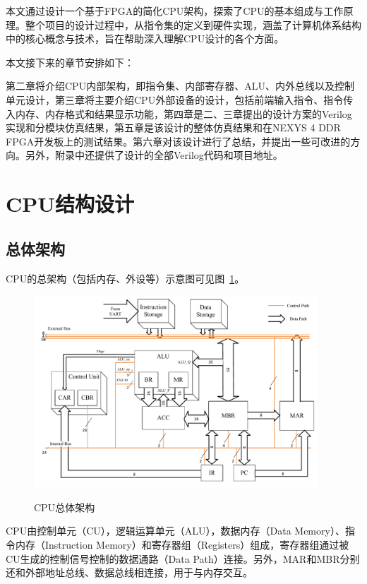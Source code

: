 \documentclass[lang=cn,a4paper,newtx]{elegantpaper}
\begin{document}
本文通过设计一个基于FPGA的简化CPU架构，探索了CPU的基本组成与工作原理。整个项目的设计过程中，从指令集的定义到硬件实现，涵盖了计算机体系结构中的核心概念与技术，旨在帮助深入理解CPU设计的各个方面。


本文接下来的章节安排如下：

第二章将介绍CPU内部架构，即指令集、内部寄存器、ALU、内外总线以及控制单元设计，第三章将主要介绍CPU外部设备的设计，包括前端输入指令、指令传入内存、内存格式和结果显示功能，第四章是二、三章提出的设计方案的Verilog实现和分模块仿真结果，第五章是该设计的整体仿真结果和在NEXYS 4 DDR FPGA开发板上的测试结果。第六章对该设计进行了总结，并提出一些可改进的方向。另外，附录中还提供了设计的全部Verilog代码和项目地址。

\section{CPU结构设计}
\subsection{总体架构}

CPU的总架构（包括内存、外设等）示意图可见图~\ref{fig:CPU}。
\begin{figure}[htbp]
  \centering
  \caption{CPU总体架构}
  \includegraphics[width = 0.95\textwidth]{figure/CPU_structure.pdf}
  \label{fig:CPU}
\end{figure}

CPU由控制单元（CU），逻辑运算单元（ALU），数据内存（Data Memory）、指令内存（Instruction Memory）和寄存器组（Registers）组成，寄存器组通过被CU生成的控制信号控制的数据通路（Data Path）连接。另外，MAR和MBR分别还和外部地址总线、数据总线相连接，用于与内存交互。
\end{document}
